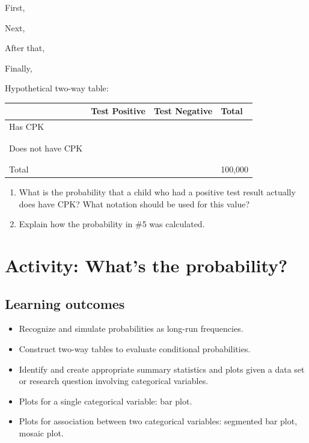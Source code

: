 \documentclass[
]{report}
\newcommand{\rgs}{\vspace{12pt}} %
\newcommand{\rgi}{\hspace{24pt}}  %
\begin{document}
\rgi First,
\rgs

\rgi Next,
\rgs

\rgi After that,
\rgs

\rgi Finally,
\rgs

\newpage

\rgi Hypothetical two-way table:

\begin{center}
\begin{tabular}{|l|p{1.3in}|p{1.3in}|p{1.3in}|}
\hline
&   Test Positive   & Test Negative & Total \\ \hline
Has CPK     & & & \\
    & & & \\
    & & & \\ \hline
Does not have CPK       & & & \\
    & & & \\
    & & & \\ \hline     
Total & & & 100,000 \\ \hline
\end{tabular}
\end{center}
\rgs

\begin{enumerate}
\def\labelenumi{\arabic{enumi}.}
\setcounter{enumi}{4}
\item
  What is the probability that a child who had a positive test result actually does have CPK? What notation should be used for this value?
  \rgs
\item
  Explain how the probability in \#5 was calculated.
\end{enumerate}

\newpage

\hypertarget{activity-whats-the-probability}{%
\section{Activity: What's the probability?}\label{activity-whats-the-probability}}


\hypertarget{learning-outcomes-2}{%
\subsection{Learning outcomes}\label{learning-outcomes-2}}

\begin{itemize}
\item
  Recognize and simulate probabilities as long-run frequencies.
\item
  Construct two-way tables to evaluate conditional probabilities.
\item
  Identify and create appropriate summary statistics and plots given a data set or research question involving categorical variables.
\item
  Plots for a single categorical variable: bar plot.
\item
  Plots for association between two categorical variables:
  segmented bar plot, mosaic plot.
\end{itemize}
\end{document}
